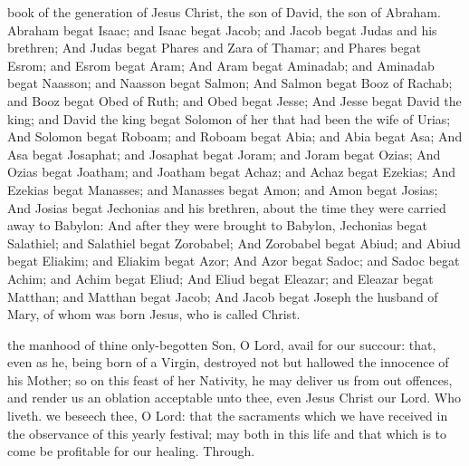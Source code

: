
 book of the generation of Jesus Christ, the son of David, the son of Abraham. Abraham begat Isaac; and Isaac begat Jacob; and Jacob begat Judas and his brethren; And Judas begat Phares and Zara of Thamar; and Phares begat Esrom; and Esrom begat Aram; And Aram begat Aminadab; and Aminadab begat Naasson; and Naasson begat Salmon; And Salmon begat Booz of Rachab; and Booz begat Obed of Ruth; and Obed begat Jesse; And Jesse begat David the king; and David the king begat Solomon of her that had been the wife of Urias; And Solomon begat Roboam; and Roboam begat Abia; and Abia begat Asa; And Asa begat Josaphat; and Josaphat begat Joram; and Joram begat Ozias; And Ozias begat Joatham; and Joatham begat Achaz; and Achaz begat Ezekias; And Ezekias begat Manasses; and Manasses begat Amon; and Amon begat Josias; And Josias begat Jechonias and his brethren, about the time they were carried away to Babylon: And after they were brought to Babylon, Jechonias begat Salathiel; and Salathiel begat Zorobabel; And Zorobabel begat Abiud; and Abiud begat Eliakim; and Eliakim begat Azor; And Azor begat Sadoc; and Sadoc begat Achim; and Achim begat Eliud; And Eliud begat Eleazar; and Eleazar begat Matthan; and Matthan begat Jacob; And Jacob begat Joseph the husband of Mary, of whom was born Jesus, who is called Christ.


\secret
{} the manhood of thine only-begotten Son, O Lord, avail for our succour: that, even as he, being born of a Virgin, destroyed not but hallowed the innocence of his Mother; so on this feast of her Nativity, he may deliver us from out offences, and render us an oblation acceptable unto thee, even Jesus Christ our Lord. Who liveth.
\postcommunion
{} we beseech thee, O Lord: that the sacraments which we have received in the observance of this yearly festival; may both in this life and that which is to come be profitable for our healing. Through.

